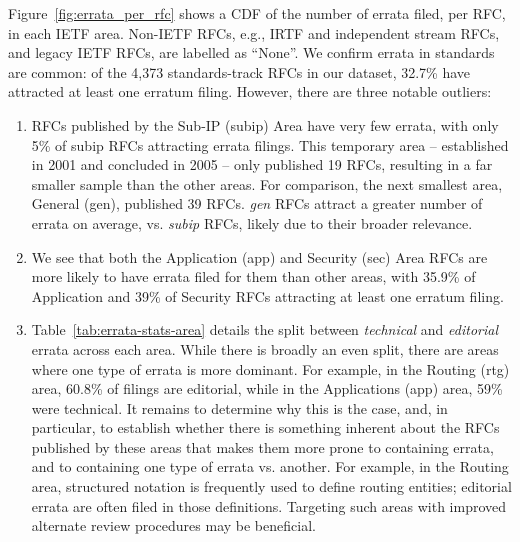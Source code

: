 \documentclass[twocolumn,10pt]{article}
\newcommand{\pb}[1]{\vspace{0.75ex}\noindent{\textbf{#1}}}
\begin{document}
\pb{Errata per RFC Area, Status, and Stream:}
Figure~\ref{fig:errata_per_rfc} shows a CDF of the number of errata filed,
per RFC, in each IETF area. Non-IETF RFCs, e.g., IRTF and independent stream
RFCs, and legacy IETF RFCs, are labelled as ``None''.  We confirm errata in
standards are common: of the 4,373 standards-track RFCs in our dataset,
32.7\% have attracted at least one erratum filing.  However, there are
three notable outliers:
\begin{enumerate}
  \item RFCs published by the Sub-IP (subip) Area have very few errata,
    with only 5\% of subip RFCs attracting errata filings. This temporary
    area -- established in 2001 and concluded in 2005 -- only published 19
    RFCs, resulting in a far smaller sample than the other areas. For
    comparison, the next smallest area, General (gen), published 39 RFCs.
    \emph{gen} RFCs attract a greater number of errata on average, vs.
    \emph{subip} RFCs, likely due to their broader relevance.  

  \item We see that both the Application (app) and Security (sec) Area
    RFCs are more likely to have errata filed for them than other areas,
    with 35.9\% of Application and 39\% of Security RFCs attracting at
    least one erratum filing.

  \item Table~\ref{tab:errata-stats-area} details the split between
    \emph{technical} and \emph{editorial} errata across each area.  While
    there is broadly an even split, there are areas where one type of
    errata is more dominant. For example, in the Routing (rtg) area, 60.8\%
    of filings are editorial, while in the Applications (app) area, 59\%
    were technical.  It remains to determine why this is the case, and, in
    particular, to establish whether there is something inherent about the
    RFCs published by these areas that makes them more prone to containing
    errata, and to containing one type of errata vs. another. For example,
    in the Routing area, structured notation is frequently used to define
    routing entities; editorial errata are often filed in those
    definitions. Targeting such areas with improved alternate review
    procedures may be beneficial.

\end{enumerate}
\end{document}
